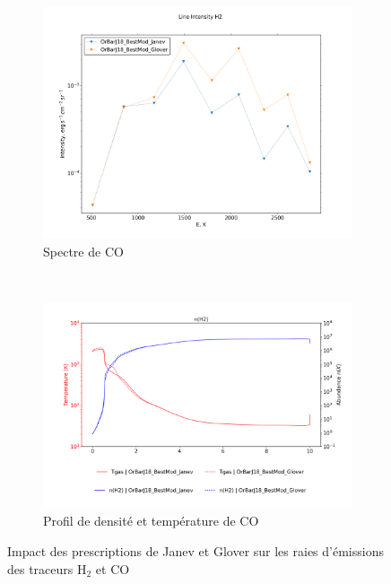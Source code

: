 \begin{figure}[h!]
    \centering
    \begin{subfigure}[t]{0.45\textwidth} %
        \centering \includegraphics[trim = {0 0 0 1.5cm},clip,width=1\textwidth]{figure/H2/JanevGlover/I_comp_H2.png}
        \caption{Spectre de $\mathrm{CO}$}
    \end{subfigure}
    ~ 
    \begin{subfigure}[t]{0.45\textwidth}
        \centering \includegraphics[trim = {0 0 0 1.5cm},clip,width=1\textwidth]{figure/H2/JanevGlover/nT_comp_H2.png}
        \caption{Profil de densité et température de $\mathrm{CO}$}
    \end{subfigure}
    \caption{Impact des prescriptions de Janev et Glover sur les raies d'émissions des traceurs $\mathrm{H}_2$ et $\mathrm{CO}$}
    \label{fig:H2:JanevGlover:emiss}
\end{figure}


